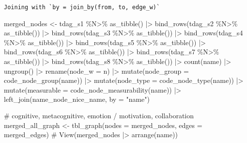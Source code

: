 \documentclass[
  letterpaper,
  DIV=11,
  numbers=noendperiod]{scrartcl}
\newenvironment{Shaded}{\begin{snugshade}}{\end{snugshade}}
\newcommand{\AttributeTok}[1]{\textcolor[rgb]{0.40,0.45,0.13}{#1}}
\newcommand{\CommentTok}[1]{\textcolor[rgb]{0.37,0.37,0.37}{#1}}
\newcommand{\FunctionTok}[1]{\textcolor[rgb]{0.28,0.35,0.67}{#1}}
\newcommand{\NormalTok}[1]{\textcolor[rgb]{0.00,0.23,0.31}{#1}}
\newcommand{\OtherTok}[1]{\textcolor[rgb]{0.00,0.23,0.31}{#1}}
\newcommand{\SpecialCharTok}[1]{\textcolor[rgb]{0.37,0.37,0.37}{#1}}
\newcommand{\StringTok}[1]{\textcolor[rgb]{0.13,0.47,0.30}{#1}}
\begin{document}
\begin{verbatim}
Joining with `by = join_by(from, to, edge_w)`
\end{verbatim}

\begin{Shaded}
\begin{Highlighting}[]
\NormalTok{merged\_nodes }\OtherTok{\textless{}{-}}\NormalTok{ tdag\_s1 }\SpecialCharTok{\%N\textgreater{}\%} \FunctionTok{as\_tibble}\NormalTok{() }\SpecialCharTok{|\textgreater{}} 
    \FunctionTok{bind\_rows}\NormalTok{(tdag\_s2 }\SpecialCharTok{\%N\textgreater{}\%} \FunctionTok{as\_tibble}\NormalTok{()) }\SpecialCharTok{|\textgreater{}} 
    \FunctionTok{bind\_rows}\NormalTok{(tdag\_s3 }\SpecialCharTok{\%N\textgreater{}\%} \FunctionTok{as\_tibble}\NormalTok{()) }\SpecialCharTok{|\textgreater{}} 
    \FunctionTok{bind\_rows}\NormalTok{(tdag\_s4 }\SpecialCharTok{\%N\textgreater{}\%} \FunctionTok{as\_tibble}\NormalTok{()) }\SpecialCharTok{|\textgreater{}} 
    \FunctionTok{bind\_rows}\NormalTok{(tdag\_s5 }\SpecialCharTok{\%N\textgreater{}\%} \FunctionTok{as\_tibble}\NormalTok{()) }\SpecialCharTok{|\textgreater{}} 
    \FunctionTok{bind\_rows}\NormalTok{(tdag\_s6 }\SpecialCharTok{\%N\textgreater{}\%} \FunctionTok{as\_tibble}\NormalTok{()) }\SpecialCharTok{|\textgreater{}} 
    \FunctionTok{bind\_rows}\NormalTok{(tdag\_s7 }\SpecialCharTok{\%N\textgreater{}\%} \FunctionTok{as\_tibble}\NormalTok{()) }\SpecialCharTok{|\textgreater{}} 
    \FunctionTok{bind\_rows}\NormalTok{(tdag\_s8 }\SpecialCharTok{\%N\textgreater{}\%} \FunctionTok{as\_tibble}\NormalTok{()) }\SpecialCharTok{|\textgreater{}} 
    \FunctionTok{count}\NormalTok{(name) }\SpecialCharTok{|\textgreater{}} \FunctionTok{ungroup}\NormalTok{() }\SpecialCharTok{|\textgreater{}} \FunctionTok{rename}\NormalTok{(}\AttributeTok{node\_w =}\NormalTok{ n) }\SpecialCharTok{|\textgreater{}} 
    \FunctionTok{mutate}\NormalTok{(}\AttributeTok{node\_group =} \FunctionTok{code\_node\_group}\NormalTok{(name)) }\SpecialCharTok{|\textgreater{}} 
    \FunctionTok{mutate}\NormalTok{(}\AttributeTok{node\_type =} \FunctionTok{code\_node\_type}\NormalTok{(name)) }\SpecialCharTok{|\textgreater{}} 
    \FunctionTok{mutate}\NormalTok{(}\AttributeTok{measurable =} \FunctionTok{code\_node\_measurability}\NormalTok{(name)) }\SpecialCharTok{|\textgreater{}} 
    \FunctionTok{left\_join}\NormalTok{(name\_node\_nice\_name, }\AttributeTok{by =} \StringTok{"name"}\NormalTok{)}

\CommentTok{\# cognitive, metacognitive, emotion / motivation, collaboration}
\NormalTok{merged\_all\_graph }\OtherTok{\textless{}{-}} \FunctionTok{tbl\_graph}\NormalTok{(}\AttributeTok{nodes =}\NormalTok{ merged\_nodes, }\AttributeTok{edges =}\NormalTok{ merged\_edges)}
\CommentTok{\# View(merged\_nodes |\textgreater{} arrange(name))}
\end{Highlighting}
\end{Shaded}
\end{document}
